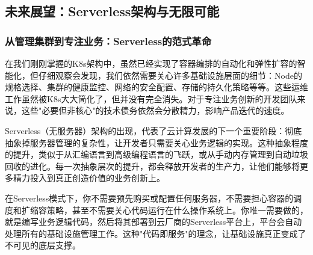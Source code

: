 


\subsection{未来展望：Serverless架构与无限可能}

\subsubsection{从管理集群到专注业务：Serverless的范式革命}

在我们刚刚掌握的K8s架构中，虽然已经实现了容器编排的自动化和弹性扩容的智能化，但仔细观察会发现，我们依然需要关心许多基础设施层面的细节：Node的规格选择、集群的健康监控、网络的安全配置、存储的持久化策略等等。这些运维工作虽然被K8s大大简化了，但并没有完全消失。对于专注业务创新的开发团队来说，这些"必要但非核心"的技术债务依然会分散精力，影响产品迭代的速度。

Serverless（无服务器）架构的出现，代表了云计算发展的下一个重要阶段：彻底抽象掉服务器管理的复杂性，让开发者只需要关心业务逻辑的实现。这种抽象程度的提升，类似于从汇编语言到高级编程语言的飞跃，或从手动内存管理到自动垃圾回收的进化。每一次抽象层次的提升，都会释放开发者的生产力，让他们能够将更多精力投入到真正创造价值的业务创新上。

在Serverless模式下，你不需要预先购买或配置任何服务器，不需要担心容器的调度和扩缩容策略，甚至不需要关心代码运行在什么操作系统上。你唯一需要做的，就是编写业务逻辑代码，然后将其部署到云厂商的Serverless平台上，平台会自动处理所有的基础设施管理工作。这种"代码即服务"的理念，让基础设施真正变成了不可见的底层支撑。

